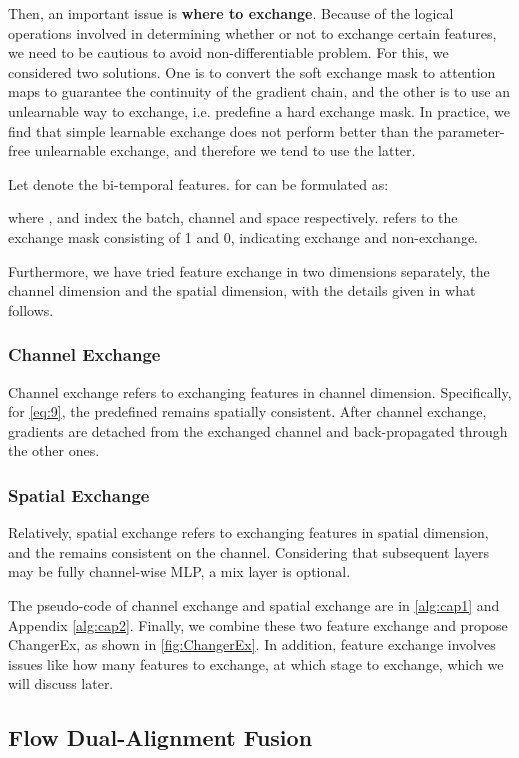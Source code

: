 \documentclass[10pt,twocolumn,letterpaper]{article}
\begin{document}
Then, an important issue is \textbf{where to exchange}. Because of the logical operations involved in determining whether or not to exchange certain features, we need to be cautious to avoid non-differentiable problem. For this, we considered two solutions. One is to convert the soft exchange mask to attention maps to guarantee the continuity of the gradient chain, and the other is to use an unlearnable way to exchange, i.e. predefine a hard exchange mask. In practice, we find that simple learnable exchange does not perform better than the parameter-free unlearnable exchange, and therefore we tend to use the latter. 

Let  denote the bi-temporal features.  for  can be formulated as:

where ,  and  index the batch, channel and space respectively.  refers to the exchange mask consisting of 1 and 0, indicating exchange and non-exchange. 

Furthermore, we have tried feature exchange in two dimensions separately, the channel dimension and the spatial dimension, with the details given in what follows.

\subsubsection{Channel Exchange}
Channel exchange refers to exchanging features in channel dimension. Specifically, for \cref{eq:9}, the predefined  remains spatially consistent. After channel exchange, gradients are detached from the exchanged channel and back-propagated through the other ones.

\subsubsection{Spatial Exchange}
Relatively, spatial exchange refers to exchanging features in spatial dimension, and the  remains consistent on the channel. Considering that subsequent layers may be fully channel-wise MLP, a mix layer is optional.

The pseudo-code of channel exchange and spatial exchange are in \cref{alg:cap1} and Appendix \cref{alg:cap2}.
Finally, we combine these two feature exchange and propose ChangerEx, as shown in \cref{fig:ChangerEx}. In addition, feature exchange involves issues like how many features to exchange, at which stage to exchange, \etc which we will discuss later.


\subsection{Flow Dual-Alignment Fusion}
\label{section:FDAF}
\end{document}
